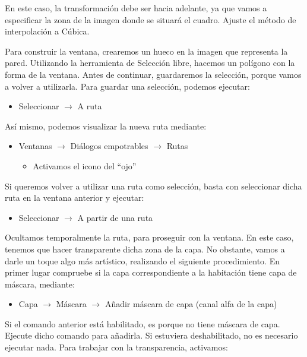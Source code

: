 \documentclass[es,practica]{uah}
\begin{document}
En este caso, la transformación debe ser hacia adelante, ya que vamos a especificar la zona de la imagen donde se situará el cuadro. Ajuste el método de interpolación a Cúbica.

Para construir la ventana, crearemos un hueco en la imagen que representa la pared. Utilizando la herramienta de Selección libre, hacemos un polígono con la forma de la ventana. Antes de continuar, guardaremos la selección, porque vamos a volver a utilizarla. Para guardar una selección, podemos ejecutar:

\begin{itemize}
	\item Seleccionar $\rightarrow$ A ruta
\end{itemize}

Así mismo, podemos visualizar la nueva ruta mediante:

\begin{itemize}
	\item Ventanas $\rightarrow$ Diálogos empotrables $\rightarrow$ Rutas
	\begin{itemize}
		\item Activamos el icono del ``ojo''
	\end{itemize}
\end{itemize}

Si queremos volver a utilizar una ruta como selección, basta con seleccionar dicha ruta en la ventana anterior y ejecutar:

\begin{itemize}
	\item Seleccionar $\rightarrow$ A partir de una ruta
\end{itemize}


Ocultamos temporalmente la ruta, para proseguir con la ventana. En este caso, tenemos que hacer transparente dicha zona de la capa. No obstante, vamos a darle un toque algo más artístico, realizando el siguiente procedimiento. En primer lugar compruebe si la capa correspondiente a la habitación tiene capa de máscara, mediante:

\begin{itemize}
	\item Capa $\rightarrow$ Máscara $\rightarrow$ Añadir máscara de capa (canal alfa de la capa)
\end{itemize}

Si el comando anterior está habilitado, es porque no tiene máscara de capa. Ejecute dicho comando para añadirla. Si estuviera deshabilitado, no es necesario ejecutar nada. Para trabajar con la transparencia, activamos:
\end{document}

